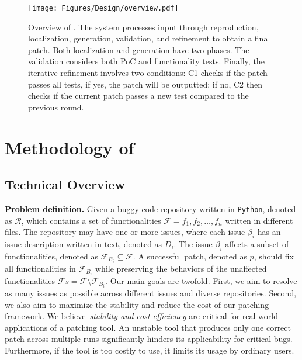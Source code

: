\begin{figure*}[tbp]
    \centering
    \texttt{[image: Figures/Design/overview.pdf]}
    \vspace{-5mm}
    \caption{Overview of \sys. The system processes input through reproduction, localization, generation, validation, and refinement to obtain a final patch. Both localization and generation have two phases. The validation considers both PoC and functionality tests.  Finally, the iterative refinement involves two conditions: C1 checks if the patch passes all tests, if yes, the patch will be outputted; if no, C2 then checks if the current patch passes a new test compared to the previous round.}
    \label{fig:overview}
\end{figure*}

\section{Methodology of \sys}
\label{sec:technique}

\subsection{Technical Overview}
\label{subsec:tech_overview}

\textbf{Problem definition.}
Given a buggy code repository written in \texttt{Python}, denoted as $\mathcal{R}$, which contains a set of functionalities $\mathcal{F} = {f_1, f_2, \dots, f_n}$ written in different files.
The repository may have one or more issues, where each issue $\beta_{i}$ has an issue description written in text, denoted as $D_i$. 
The issue $\beta_{i}$ affects a subset of functionalities, denoted as $\mathcal{F}_{B_{i}} \subseteq \mathcal{F}$.
A successful patch, denoted as $p$, should fix all functionalities in $\mathcal{F}_{B_{i}}$ while preserving the behaviors of the unaffected functionalities $\mathcal{F}{s} = \mathcal{F} \setminus \mathcal{F}_{B_{i}}$.
Our main goals are twofold. 
First, we aim to resolve as many issues as possible across different issues and diverse repositories.
Second, we also aim to maximize the stability and reduce the cost of our patching framework.
We believe~\emph{stability and cost-efficiency} are critical for real-world applications of a patching tool. 
An unstable tool that produces only one correct patch across multiple runs significantly hinders its applicability for critical bugs.
Furthermore, if the tool is too costly to use, it limits its usage by ordinary users.

